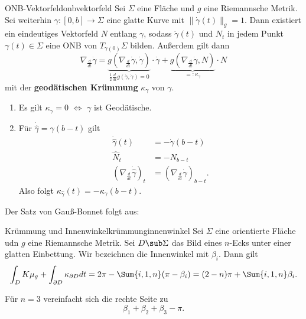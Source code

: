 \begin{satz}{ONB-Vektorfeld}{onbvektorfeld}
Sei $\Sigma$ eine Fläche und $g$ eine Riemannsche Metrik. Sei weiterhin $\gamma: [0,b] \to \Sigma$ eine glatte Kurve mit $\| \dot{\gamma} (t)\|_g = 1$. Dann existiert ein eindeutiges Vektorfeld $N$ entlang $\gamma$, sodass $\dot{\gamma}(t)$ und $N_t$ in jedem Punkt $\gamma(t) \in \Sigma$ eine ONB von $T_{\gamma(0)}\Sigma$ bilden. Außerdem gilt dann
\begin{equation}
\nabla_\frac{d}{dt} \dot{\gamma} = \underbrace{g(\nabla_\frac{d}{dt} \dot{\gamma}, \dot{\gamma})}_{\frac{1}{2} \frac{d}{dt} g(\dot{\gamma}, \dot{\gamma}) = 0}\cdot \dot{\gamma} + \underbrace{g (\nabla_\frac{d}{dt} \dot{\gamma}, N)}_{=: \kappa_\gamma} \cdot N
\end{equation}
mit der \textbf{geodätischen Krümmung} $\kappa_\gamma$ von $\gamma$.
\end{satz}
\begin{bemerkungen}
\begin{enumerate}
\item Es gilt $\kappa_\gamma = 0$ $\iff$ $\gamma$ ist Geodätische.
\item Für $\dot{\hat{\gamma}} = \gamma(b-t)$ gilt
\begin{align}
\dot{\hat{\gamma}} (t) &= - \dot{\gamma} (b-t)\\
\hat{N}_t &= -N_{b-t}\\
\left( \nabla_\frac{d}{dt} \dot{\hat{\gamma}}\right)_t &= \left( \nabla_\frac{d}{dt} \dot{\gamma} \right)_{b-t}.
\end{align}
Also folgt $\kappa_{\hat{\gamma}}(t)=-\kappa_\gamma(b-t)$.
\end{enumerate}
\end{bemerkungen}
Der Satz von Gauß-Bonnet folgt aus:
\begin{satz}{Krümmung und Innenwinkel}{krümmunginnenwinkel}
Sei $\Sigma$ eine orientierte Fläche udn $g$ eine Riemannsche Metrik. Sei $D\sub \Sigma$ das Bild eines $n$-Ecks unter einer glatten Einbettung. Wir bezeichnen die Innenwinkel mit $\beta_i$. Dann gilt
\begin{equation}
\int_D K \mu_g + \int_{\partial D} \kappa_{\partial D} dt = 2 \pi- \Sum{i,1,n} (\pi - \beta_i) = (2-n) \pi + \Sum{i,1,n} \beta_i.
\end{equation}
\end{satz}
\begin{bemerkung}
Für $n=3$ vereinfacht sich die rechte Seite zu 
\begin{equation}
\beta_1 + \beta_2 + \beta_3 - \pi.
\end{equation}
\end{bemerkung}
